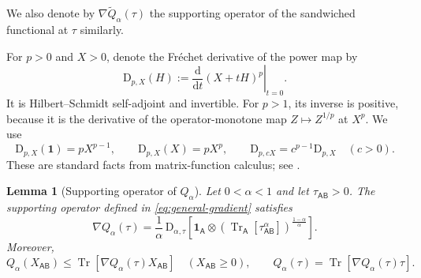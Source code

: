 \documentclass[11pt,reqno]{amsart}
\newtheorem{lemma}[lemma]{Lemma}
\theoremstyle{definition}
\DeclareMathOperator{\Tr}{Tr}
\newcommand{\I}{\mathbf 1}
\newcommand{\A}{\mathsf{A}}
\newcommand{\B}{\mathsf{B}}
\newcommand{\dd}{\mathrm d}
\newcommand{\sand}{\widetilde}
\begin{document}
We also denote by $\nabla\sand Q_{\alpha}(\tau)$ the supporting operator
of the sandwiched functional at $\tau$ similarly.

For $p>0$ and $X>0$, denote the Fr\'echet derivative of the power map by
\begin{equation}\label{eq:Frechet-derivative}
	\mathrm D_{p,X}(H)
	:=\left.\frac{\dd}{\dd t}(X+tH)^p\right|_{t=0}.
\end{equation}
It is Hilbert--Schmidt self-adjoint and invertible. For $p>1$, its inverse is positive,
because it is the derivative of the operator-monotone map
$Z\mapsto Z^{1/p}$ at $X^p$.  We use
\begin{equation}\label{eq:Frechet-identities}
	\mathrm D_{p,X}(\I)=pX^{p-1},
	\qquad
	\mathrm D_{p,X}(X)=pX^p,
	\qquad
	\mathrm D_{p,cX}=c^{p-1}\mathrm D_{p,X}
	\quad(c>0).
\end{equation}
These are standard facts from matrix-function calculus; see
\cite{Bhatia1997,Higham2008}.

\begin{lemma}[Supporting operator of $Q_\alpha$]\label{lem:supporting-operator}
Let $0<\alpha<1$ and let $\tau_{\A\B}>0$. 
The supporting operator defined in \cref{eq:general-gradient} satisfies
\begin{equation}\label{eq:general-gradient-formula}
\nabla Q_{\alpha}(\tau)
 =\frac1\alpha\,
 \mathrm D_{\alpha,\tau}
 \!\left[
 \I_{\A}\otimes
 \left(\Tr_{\A}[\tau_{\A\B}^{\alpha}]\right)^{\frac{1-\alpha}{\alpha}}
 \right].
\end{equation}
Moreover,
\begin{equation}\label{eq:supporting-score}
 Q_\alpha(X_{\A\B})\leq\Tr\!\left[\nabla Q_{\alpha}(\tau) X_{\A\B}\right]
 \quad(X_{\A\B}\geq0),
 \qquad
 Q_\alpha(\tau)=\Tr\!\left[ \nabla Q_{\alpha}(\tau) \tau\right].
\end{equation}
\end{lemma}
\end{document}
